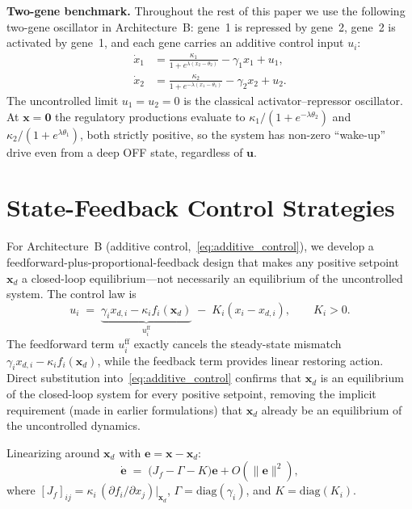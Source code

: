 \documentclass[12pt]{article}
\begin{document}
\smallskip
\noindent\textbf{Two-gene benchmark.}\;
Throughout the rest of this paper we use the following two-gene
oscillator in Architecture~B: gene~1 is repressed by gene~2, gene~2
is activated by gene~1, and each gene carries an additive control input
$u_i$:
\begin{equation}
\boxed{
\begin{aligned}
\dot{x}_1 &= \frac{\kappa_1}{1+e^{\lambda(x_2 - \theta_2)}} - \gamma_1 x_1 + u_1,\\[2pt]
\dot{x}_2 &= \frac{\kappa_2}{1+e^{-\lambda(x_1 - \theta_1)}} - \gamma_2 x_2 + u_2.
\end{aligned}
}
\label{eq:two_gene_B}
\end{equation}
The uncontrolled limit $u_1=u_2=0$ is the classical activator--repressor
oscillator. At $\mathbf{x}=\mathbf{0}$ the regulatory productions evaluate
to $\kappa_1/(1+e^{-\lambda\theta_2})$ and $\kappa_2/(1+e^{\lambda\theta_1})$,
both strictly positive, so the system has non-zero
``wake-up'' drive even from a deep OFF state, regardless of $\mathbf{u}$.

\section{State-Feedback Control Strategies}
\label{sec:state_feedback}

For Architecture~B (additive control,~\eqref{eq:additive_control}), we
develop a feedforward-plus-proportional-feedback design that makes any
positive setpoint $\mathbf{x}_d$ a closed-loop equilibrium---not necessarily
an equilibrium of the uncontrolled system. The control law is
\begin{equation}
u_i \;=\; \underbrace{\gamma_i x_{d,i} - \kappa_i f_i(\mathbf{x}_d)}_{u_i^{\mathrm{ff}}}
   \;-\; K_i (x_i - x_{d,i}),\qquad K_i>0.
\label{eq:sf_law}
\end{equation}
The feedforward term $u_i^{\mathrm{ff}}$ exactly cancels the steady-state
mismatch $\gamma_i x_{d,i} - \kappa_i f_i(\mathbf{x}_d)$, while the feedback
term provides linear restoring action. Direct substitution
into~\eqref{eq:additive_control} confirms that $\mathbf{x}_d$ is an
equilibrium of the closed-loop system for every positive setpoint, removing
the implicit requirement (made in earlier formulations) that $\mathbf{x}_d$
already be an equilibrium of the uncontrolled dynamics.

Linearizing around $\mathbf{x}_d$ with $\mathbf{e}=\mathbf{x}-\mathbf{x}_d$:
\begin{equation}
\dot{\mathbf{e}} \;=\; \bigl(J_f - \Gamma - K\bigr)\mathbf{e}+O(\|\mathbf{e}\|^2),
\label{eq:linearized_cl}
\end{equation}
where $[J_f]_{ij}=\kappa_i \,(\partial f_i/\partial x_j)|_{\mathbf{x}_d}$,
$\Gamma=\mathrm{diag}(\gamma_i)$, and $K=\mathrm{diag}(K_i)$.
\end{document}
